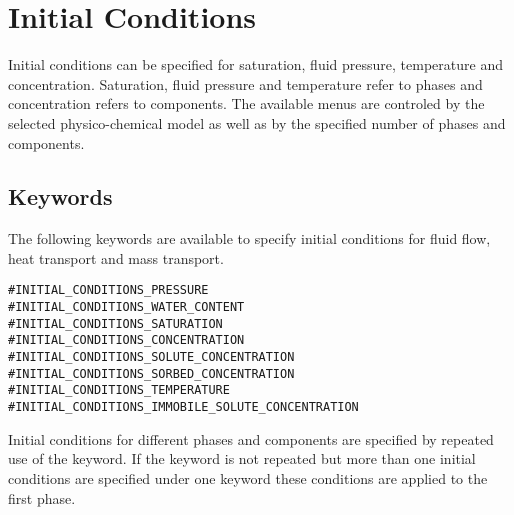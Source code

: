 \section{Initial Conditions}
Initial conditions can be specified for saturation, fluid pressure,
temperature and concentration. Saturation, fluid pressure and temperature
refer to phases and concentration refers to components. The available
menus are controled by the selected physico-chemical model as well as
by the specified number of phases and components.

\subsection{Keywords}

The following keywords are available to specify initial conditions
for fluid flow, heat transport and mass transport.

\begin{verbatim}
#INITIAL_CONDITIONS_PRESSURE
#INITIAL_CONDITIONS_WATER_CONTENT
#INITIAL_CONDITIONS_SATURATION
#INITIAL_CONDITIONS_CONCENTRATION
#INITIAL_CONDITIONS_SOLUTE_CONCENTRATION
#INITIAL_CONDITIONS_SORBED_CONCENTRATION
#INITIAL_CONDITIONS_TEMPERATURE
#INITIAL_CONDITIONS_IMMOBILE_SOLUTE_CONCENTRATION
\end{verbatim}
Initial conditions for different phases and components are specified by
repeated use of the keyword. If the keyword is not repeated but more than
one initial conditions are specified under one keyword these conditions
are applied to the first phase.


